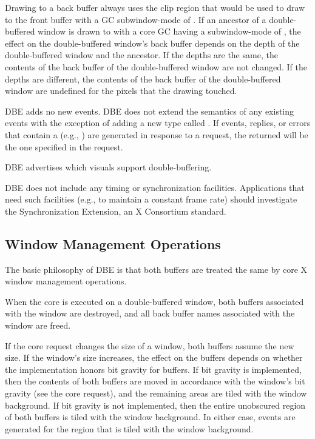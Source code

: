 Drawing to a back buffer always uses the clip region that would be
used to draw to the front buffer with a GC subwindow-mode of
.  If an ancestor of a double-buffered window is drawn
to with a core GC having a subwindow-mode of , the
effect on the double-buffered window's back buffer depends on the
depth of the double-buffered window and the ancestor.  If the depths
are the same, the contents of the back buffer of the double-buffered
window are not changed.  If the depths are different, the contents of
the back buffer of the double-buffered window are undefined for the
pixels that the  drawing touched.

DBE adds no new events.  DBE does not extend the semantics of any
existing events with the exception of adding a new 
type called .  If events, replies, or errors that
contain a  (e.g., ) are
generated in
response to a request, the  returned will be the
one specified in the request.

DBE advertises which visuals support double-buffering.

DBE does not include any timing or synchronization facilities.
Applications that need such facilities (e.g., to maintain a constant
frame rate) should investigate the Synchronization Extension, an X
Consortium standard.

\subsection{Window Management Operations}

The basic philosophy of DBE is that both buffers are treated the same by
core X window management operations.

When the core  is executed on a
double-buffered window, both buffers associated with the window are
destroyed, and all back buffer names associated with the window are
freed.

If the core  request changes the size of
a window, both buffers assume the new size.  If the window's size
increases, the effect on the buffers depends on whether the
implementation honors bit gravity for buffers.  If bit gravity is
implemented, then the contents of both buffers are moved in accordance
with the window's bit gravity (see the core
 request), and the remaining areas are
tiled with the window background.  If bit gravity is not implemented,
then the entire unobscured region of both buffers is tiled with the
window background.  In either case,  events are generated for
the region that is tiled with the window background.

